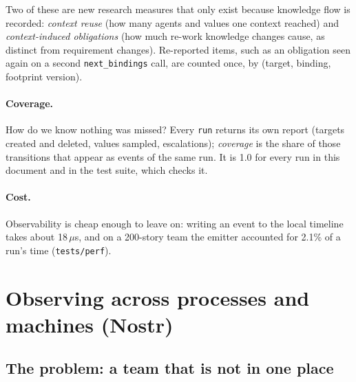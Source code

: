 \documentclass[10pt,a4paper]{article}
\newcommand{\code}[1]{\texttt{#1}}
\newcommand{\file}[1]{\texttt{#1}}
\theoremstyle{definition}
\begin{document}
\noindent Two of these are new research measures that only exist because
knowledge flow is recorded: \emph{context reuse} (how many agents and values
one context reached) and \emph{context-induced obligations} (how much
re-work knowledge changes cause, as distinct from requirement changes).
Re-reported items, such as an obligation seen again on a second
\code{next\_bindings} call, are counted once, by (target, binding,
footprint version).

\paragraph{Coverage.} How do we know nothing was missed? Every
\code{run} returns its own report (targets created and deleted, values
sampled, escalations); \emph{coverage} is the share of those transitions that
appear as events of the same run. It is 1.0 for every run in this document
and in the test suite, which checks it.

\paragraph{Cost.} Observability is cheap enough to leave on: writing an event
to the local timeline takes about 18\,$\mu$s, and on a 200-story team the
emitter accounted for 2.1\% of a run's time (\file{tests/perf}).

\section{Observing across processes and machines (Nostr)}\label{sec:nostr}

\subsection{The problem: a team that is not in one place}
\end{document}
